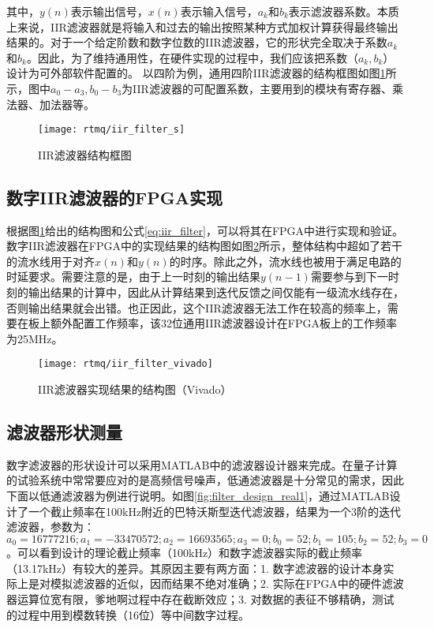 
其中，$y(n)$表示输出信号，$x(n)$表示输入信号，$a_k$和$b_k$表示滤波器系数。本质上来说，IIR滤波器就是将输入和过去的输出按照某种方式加权计算获得最终输出结果的。对于一个给定阶数和数字位数的IIR滤波器，它的形状完全取决于系数$a_k$和$b_k$。因此，为了维持通用性，在硬件实现的过程中，我们应该把系数（$a_k, b_k$）设计为可外部软件配置的。
以四阶为例，通用四阶IIR滤波器的结构框图如图\ref{fig:iir_filter_s}所示，图中$a_0-a_3, b_0-b_3$为IIR滤波器的可配置系数，主要用到的模块有寄存器、乘法器、加法器等。
\begin{figure}
    \centering
    \caption[IIR滤波器结构框图]{IIR滤波器结构框图\label{fig:iir_filter_s}}
    \texttt{[image: rtmq/iir\_filter\_s]}
\end{figure}


\subsection[数字IIR滤波器的FPGA实现]{数字IIR滤波器的FPGA实现}

根据图\ref{fig:iir_filter_s}给出的结构图和公式\eqref{eq:iir_filter}，可以将其在FPGA中进行实现和验证。数字IIR滤波器在FPGA中的实现结果的结构图如图\ref{fig:iir_filter_vivado}所示，整体结构中超如了若干的流水线用于对齐$x(n)$和$y(n)$的时序。除此之外，流水线也被用于满足电路的时延要求。需要注意的是，由于上一时刻的输出结果$y(n-1)$需要参与到下一时刻的输出结果的计算中，因此从计算结果到迭代反馈之间仅能有一级流水线存在，否则输出结果就会出错。也正因此，这个IIR滤波器无法工作在较高的频率上，需要在板上额外配置工作频率，该32位通用IIR滤波器设计在FPGA板上的工作频率为25MHz。

\begin{figure}
    \centering
    \caption[IIR滤波器实现结果的结构图]{IIR滤波器实现结果的结构图（Vivado）\label{fig:iir_filter_vivado}}
    \texttt{[image: rtmq/iir\_filter\_vivado]}
\end{figure}




\subsection[滤波器形状测量]{滤波器形状测量}
数字滤波器的形状设计可以采用MATLAB中的滤波器设计器来完成。在量子计算的试验系统中常常要应对的是高频信号噪声，低通滤波器是十分常见的需求，因此下面以低通滤波器为例进行说明。如图\ref{fig:filter_design_real1}，通过MATLAB设计了一个截止频率在100kHz附近的巴特沃斯型迭代滤波器，结果为一个3阶的迭代滤波器，参数为：$a_0=16777216;
a_1=-33470572;
a_2=16693565;
a_3=0;
b_0=52;
b_1=105;
b_2=52;
b_3=0$。可以看到设计的理论截止频率（100kHz）和数字滤波器实际的截止频率（13.17kHz）有较大的差异。其原因主要有两方面：1. 数字滤波器的设计本身实际上是对模拟滤波器的近似，因而结果不绝对准确；2. 实际在FPGA中的硬件滤波器运算位宽有限，爹地啊过程中存在截断效应；3. 对数据的表征不够精确，测试的过程中用到模数转换（16位）等中间数字过程。


